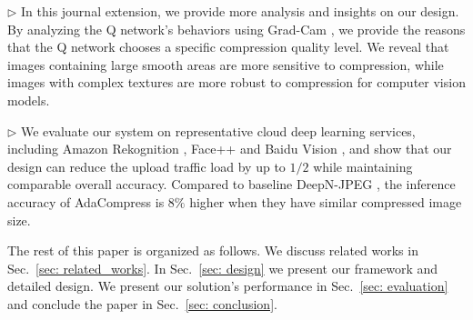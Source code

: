 $\rhd$ In this journal extension, we provide more analysis and insights on our design. By analyzing the Q network's behaviors using Grad-Cam \cite{grad-cam}, we provide the reasons that the Q network chooses a specific compression quality level. We reveal that images containing large smooth areas are more sensitive to compression, while images with complex textures are more robust to compression for computer vision models.
	
$\rhd$ We evaluate our system on representative cloud deep learning services, including Amazon Rekognition \cite{amazon_rekognition}, Face++ \cite{face++_service} and Baidu Vision \cite{baidu_vision}, and show that our design can reduce the upload traffic load by up to $1/2$ while maintaining comparable overall accuracy. Compared to baseline DeepN-JPEG \cite{DeepN-JPEG}, the inference accuracy of AdaCompress is $8\%$ higher when they have similar compressed image size.


The rest of this paper is organized as follows. We discuss related works in Sec.~\ref{sec: related_works}. In Sec.~\ref{sec: design} we present our framework and detailed design. We present our solution's performance in Sec.~\ref{sec: evaluation} and conclude the paper in Sec.~\ref{sec: conclusion}.


